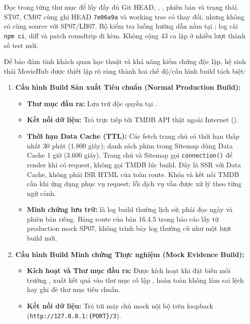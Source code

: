 \documentclass[12pt,a4paper]{extarticle}
\begin{document}
Đọc  trong từng thư mục để lấy đầy đủ Git HEAD, , , phiên bản và trạng thái. ST07, CM07 cùng ghi HEAD \texttt{7e06a9a} và working tree có thay đổi, nhưng không có cùng source với SP07/LB07. Bộ kiểm tra luồng hướng dẫn nằm tại ; log cài \texttt{npm ci}, diff và patch roundtrip đi kèm. Không cộng 43 ca lặp ở nhiều lượt thành số test mới.

Để bảo đảm tính khách quan học thuật và khả năng kiểm chứng độc lập, hệ sinh thái MovieHub được thiết lập rõ ràng thành hai chế độ/cấu hình build tách biệt:
\begin{enumerate}[noitemsep]
    \item \textbf{Cấu hình Build Sản xuất Tiêu chuẩn (Normal Production Build):}
    \begin{itemize}[noitemsep]
        \item \textbf{Thư mục đầu ra:} Lưu trữ độc quyền tại .
        \item \textbf{Kết nối dữ liệu:} Trỏ trực tiếp tới TMDB API thật ngoài Internet ().
        \item \textbf{Thời hạn Data Cache (TTL):} Các fetch trang chủ có thời hạn thấp nhất 30 phút (1.800 giây); danh sách phim trong Sitemap dùng Data Cache 1 giờ (3.600 giây). Trang chủ và Sitemap gọi \texttt{connection()} để render khi có request, không gọi TMDB lúc build. Đây là SSR với Data Cache, không phải ISR HTML của toàn route. Khóa và kết nối TMDB cần khi ứng dụng phục vụ request; lỗi dịch vụ vẫn được xử lý theo từng ngữ cảnh.
        \item \textbf{Minh chứng lưu trữ:}  là log build thường lịch sử; phải đọc ngày và phiên bản riêng. Bảng route của bản 16.4.5 trong báo cáo lấy từ production mock SP07, không trình bày log thường cũ như một lượt build mới.
    \end{itemize}
    \item \textbf{Cấu hình Build Minh chứng Thực nghiệm (Mock Evidence Build):}
    \begin{itemize}[noitemsep]
        \item \textbf{Kích hoạt và Thư mục đầu ra:} Được kích hoạt khi đặt biến môi trường , xuất kết quả vào thư mục cô lập , hoàn toàn không làm sai lệch hay ghi đè thư mục  tiêu chuẩn.
        \item \textbf{Kết nối dữ liệu:} Trỏ tới máy chủ mock nội bộ trên loopback (\texttt{http://127.0.0.1:\{PORT\}/3}).

\end{itemize}
\end{enumerate}
\end{document}
